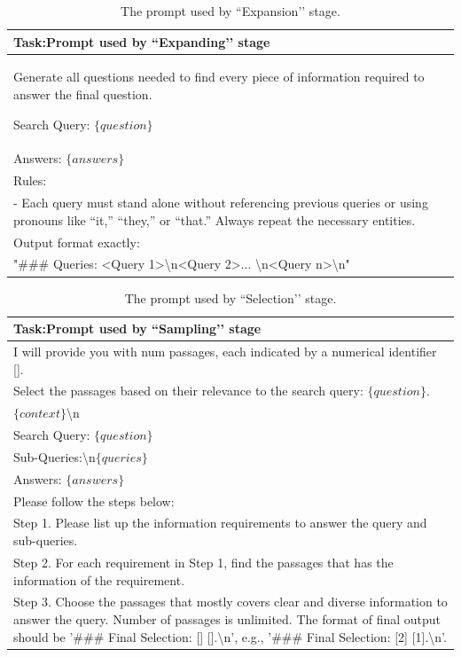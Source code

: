 \documentclass[11pt]{article}
\begin{document}
\begin{table}[h!t]
    \centering
    \begin{tabularx}{0.925\linewidth}{>{\raggedright\arraybackslash}X}
        \toprule
        \textbf{Task}:Prompt used by ``Expanding’’ stage \\
        \midrule
Generate all questions needed to find every piece of information required to answer the final question.

Search Query: $\{question\}$ \\
Answers: $\{answers\}$ \\
Rules: \\
- Each query must stand alone without referencing previous queries or using pronouns like “it,” “they,” or “that.” Always repeat the necessary entities. \\
Output format exactly:\\
"\#\#\# Queries: <Query 1>\textbackslash n<Query 2>... \textbackslash n<Query n>\textbackslash n" \\ 
    \bottomrule
    \end{tabularx}
    \caption{The prompt used by ``Expansion’’ stage.}
    \label{tab:prompt-expand}
\end{table}

\begin{table}[h!t]
    \centering
    \begin{tabularx}{0.925\linewidth}{>{\raggedright\arraybackslash}X}
        \toprule
        \textbf{Task}:Prompt used by ``Sampling’’ stage \\
        \midrule
I will provide you with {num} passages, each indicated by a numerical identifier []. \\
Select the passages based on their relevance to the search query: $\{question\}$.\\
$\{context\}$\textbackslash n \\
Search Query: $\{question\}$ \\
Sub-Queries:\textbackslash n$\{queries\}$ \\
Answers: $\{answers\}$ \\
Please follow the steps below:\\
Step 1. Please list up the information requirements to answer the query and sub-queries.\\
Step 2. For each requirement in Step 1, find the passages that has the information of the requirement.\\
Step 3. Choose the passages that mostly covers clear and diverse information to answer the query. Number of passages is unlimited. The format of final output should be '\#\#\# Final Selection: [] [].\textbackslash n', e.g., '\#\#\# Final Selection: [2] [1].\textbackslash n'. \\
    \bottomrule
    \end{tabularx}
    \caption{The prompt used by ``Selection’’ stage.}
    \label{tab:prompt-sampling}
\end{table}
\end{document}
